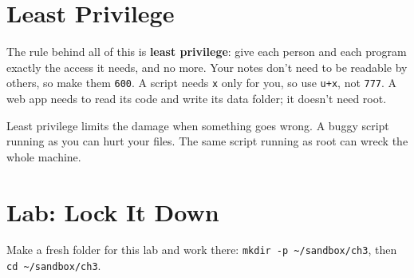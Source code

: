 \section{Least Privilege}\label{03-files-folders-and-who-may-touch-them:least-privilege}

The rule behind all of this is \textbf{least privilege}: give each person and each program exactly the access it needs, and no more. Your notes don't need to be readable by others, so make them \texttt{600}. A script needs \texttt{x} only for you, so use \texttt{u+x}, not \texttt{777}. A web app needs to read its code and write its data folder; it doesn't need root.

Least privilege limits the damage when something goes wrong. A buggy script running as you can hurt your files. The same script running as root can wreck the whole machine.

\section{Lab: Lock It Down}\label{03-files-folders-and-who-may-touch-them:lab-lock-it-down}

Make a fresh folder for this lab and work there: \texttt{mkdir\ -p\ \textasciitilde{}/}\allowbreak{}\texttt{sandbox/}\allowbreak{}\texttt{ch3}, then \texttt{cd\ \textasciitilde{}/sandbox/ch3}.

